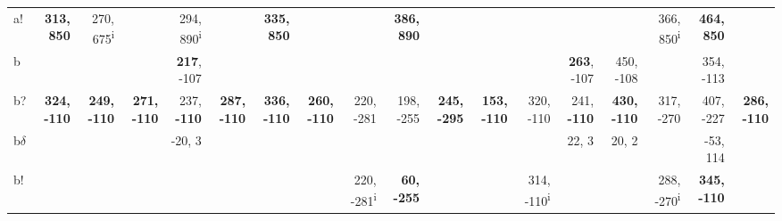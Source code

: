 \begin{table}[p]
{\begin{tabular}{lrrrrrrrrrrrrrrrrr}
a! & \textbf{313, 850} & 270, 675\textsuperscript{i} &  & 294, 890\textsuperscript{i} &  & \textbf{335, 850} &  &  & \textbf{386, 890} &  &  &  &  &  & 366, 850\textsuperscript{i} & \textbf{464, 850} &  \\
b &  &  &  & \textbf{217}, -107 &  &  &  &  &  &  &  &  & \textbf{263}, -107 & 450, -108 &  & 354, -113 &  \\
b? & \textbf{324, -110} & \textbf{249, -110} & \textbf{271, -110} & 237, \textbf{-110} & \textbf{287, -110} & \textbf{336, -110} & \textbf{260, -110} & 220, -281 & 198, -255 & \textbf{245, -295} & \textbf{153, -110} & 320, -110 & 241, \textbf{-110} & \textbf{430, -110} & 317, -270 & 407, -227 & \textbf{286, -110} \\
b$\delta$ &  &  &  & -20, 3 &  &  &  &  &  &  &  &  & 22, 3 & 20, 2 &  & -53, 114 &  \\
b! &  &  &  &  &  &  &  & 220, -281\textsuperscript{i} & \textbf{60, -255} &  &  & 314, -110\textsuperscript{i} &  &  & 288, -270\textsuperscript{i} & \textbf{345, -110} &  \\

\end{tabular}
}
\end{table}
\clearpage


